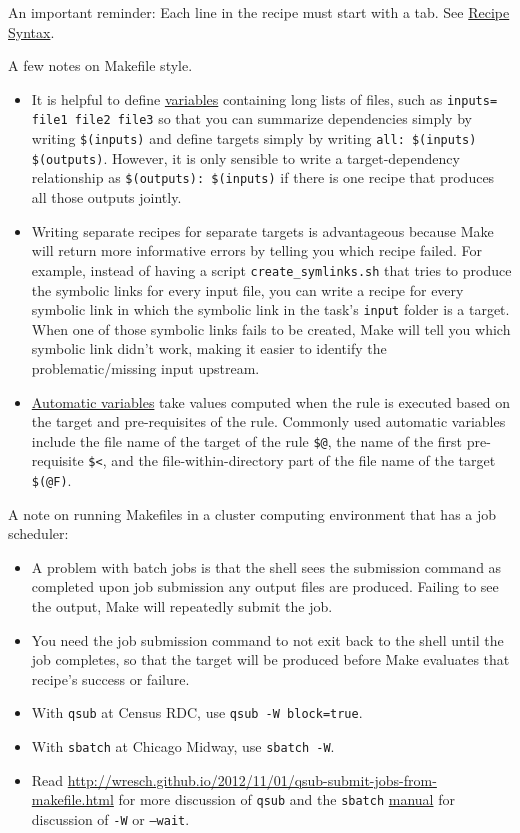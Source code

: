An important reminder: Each line in the recipe must start with a tab.
See \href{https://www.gnu.org/software/make/manual/html_node/Recipe-Syntax.html}{Recipe Syntax}.

A few notes on Makefile style.
\begin{itemize}
\item It is helpful to define \href{https://www.gnu.org/software/make/manual/html_node/Variables-Simplify.html#Variables-Simplify}{variables} containing long lists of files, such as \texttt{inputs= file1 file2 file3}
so that you can summarize dependencies simply by writing \texttt{\$(inputs)}
and define targets simply by writing \texttt{all: \$(inputs) \$(outputs)}.
However, it is only sensible to write a target-dependency relationship as
\texttt{\$(outputs): \$(inputs)}
if there is one recipe that produces all those outputs jointly.
\item Writing separate recipes for separate targets is advantageous because Make will return more informative errors by telling you which recipe failed.
For example, instead of having a script \texttt{create\_symlinks.sh} that tries to produce the symbolic links for every input file,
you can write a recipe for every symbolic link in which the symbolic link in the task's \texttt{input} folder is a target.
When one of those symbolic links fails to be created, Make will tell you which symbolic link didn't work, making it easier to identify the problematic/missing input upstream.
\item \href{https://www.gnu.org/software/make/manual/html_node/Automatic-Variables.html}{Automatic variables} take values computed when the rule is executed based on the target and pre-requisites of the rule. 
Commonly used automatic variables include 
the file name of the target of the rule \texttt{\$@},
the name of the first pre-requisite \texttt{\$<},
and
the file-within-directory part of the file name of the target \texttt{\$(@F)}.

\end{itemize}

A note on running Makefiles in a cluster computing environment that has a job scheduler:
\begin{itemize}
	\item A problem with batch jobs is that the shell sees the submission command as completed upon job submission any output files are produced.
	Failing to see the output, Make will repeatedly submit the job.
	\item You need the job submission command to not exit back to the shell until the job completes, so that the target will be produced before Make evaluates that recipe's success or failure.
	\item With \texttt{qsub} at Census RDC, use \texttt{qsub -W block=true}.
	\item With \texttt{sbatch} at Chicago Midway, use \texttt{sbatch -W}.
	\item Read \url{http://wresch.github.io/2012/11/01/qsub-submit-jobs-from-makefile.html} for more discussion of \texttt{qsub} and the \texttt{sbatch} \href{https://slurm.schedmd.com/sbatch.html}{manual} for discussion of \texttt{-W} or \texttt{--wait}. 
\end{itemize}


